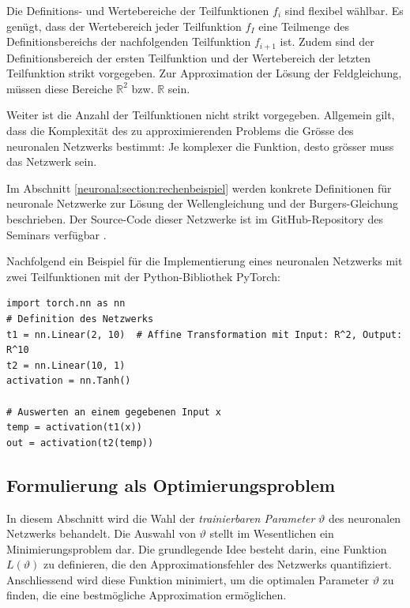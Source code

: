 Die Definitions- und Wertebereiche der Teilfunktionen \( f_i \) sind flexibel wählbar. 
Es genügt, dass der Wertebereich jeder Teilfunktion \( f_I \) eine Teilmenge des Definitionsbereichs der nachfolgenden Teilfunktion \( f_{i+1} \) ist.
Zudem sind der Definitionsbereich der ersten Teilfunktion und der Wertebereich der letzten Teilfunktion strikt vorgegeben. 
Zur Approximation der Lösung der Feldgleichung, müssen diese Bereiche \( \mathbb{R}^2 \) bzw. \( \mathbb{R} \) sein.

Weiter ist die Anzahl der Teilfunktionen nicht strikt vorgegeben. 
Allgemein gilt, dass die Komplexität des zu approximierenden Problems die Grösse des neuronalen Netzwerks bestimmt: Je komplexer die Funktion, desto grösser muss das Netzwerk sein.

Im Abschnitt \ref{neuronal:section:rechenbeispiel} werden konkrete Definitionen für neuronale Netzwerke zur Lösung der Wellengleichung und der Burgers-Gleichung beschrieben.
Der Source-Code dieser Netzwerke ist im GitHub-Repository des Seminars verfügbar \cite{neuronal:github_source_code}.

Nachfolgend ein Beispiel für die Implementierung eines neuronalen Netzwerks mit zwei Teilfunktionen mit der Python-Bibliothek PyTorch:

\begin{lstlisting}
import torch.nn as nn
# Definition des Netzwerks
t1 = nn.Linear(2, 10)  # Affine Transformation mit Input: R^2, Output: R^10
t2 = nn.Linear(10, 1)
activation = nn.Tanh()

# Auswerten an einem gegebenen Input x
temp = activation(t1(x))
out = activation(t2(temp))
\end{lstlisting}

\subsection{Formulierung als Optimierungsproblem}\label{neuronal:subsection:optimierungsproblem}
In diesem Abschnitt wird die Wahl der \emph{trainierbaren Parameter} $\vartheta$ des neuronalen Netzwerks behandelt.
Die Auswahl von $\vartheta$ stellt im Wesentlichen ein Minimierungsproblem dar.
Die grundlegende Idee besteht darin, eine Funktion \( L(\vartheta) \) zu definieren, die den Approximationsfehler des Netzwerks quantifiziert.
Anschliessend wird diese Funktion minimiert, um die optimalen Parameter $\vartheta$ zu finden, die eine bestmögliche Approximation ermöglichen.

